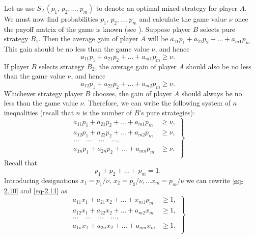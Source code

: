  Let us use $S_{A} (p_{1}, \, p_{2}, \ldots{}, p_{m})$ to denote an optimal mixed strategy for player $A$. We must now find probabilities $p_{1}, \, p_{2}, \ldots{}, p_{m}$ and calculate the game value $\nu$ once the payoff matrix of the game is known (see ). Suppose player $B$ selects pure strategy $B_{1}$. Then the average gain of player $A$ will be $a_{11}p_{1} + a_{21}p_{2}+ \ldots{} + a_{m1}p_{m}$ This gain should be no less than the game value $\nu$, and hence
\begin{equation*}%
a_{11}p_{1} + a_{21}p_{2}+ \ldots + a_{m1}p_{m} \geqslant \nu.
\end{equation*}
If player $B$ selects strategy $B_{2}$, the average gain of player $A$ should also
be no less than the game value $\nu$, and hence
\begin{equation*}%
a_{12}p_{1} + a_{22}p_{2}+ \ldots + a_{m2}p_{m} \geqslant \nu.
\end{equation*}
Whichever strategy player $B$ chooses, the gain of player $A$ should
always be no less than the game value $\nu$. Therefore, we can write the
following system of $n$ inequalities (recall that $n$ is the number of $B$'s pure
strategies):
\begin{equation}%
\left.
\begin{split}
a_{11}p_{1} + a_{21}p_{2}+ \ldots + a_{m1}p_{m} & \geqslant \nu, \\
a_{12}p_{1} + a_{22}p_{2}+ \ldots + a_{m2}p_{m} & \geqslant \nu, \\
\ldots \quad \ldots \quad \ldots  \quad \ldots, \\
a_{1n}p_{1} + a_{2n}p_{2}+ \ldots + a_{mn}p_{m} & \geqslant \nu. \\
\end{split}
\right\}
\label{eq-2.10}
\end{equation}
Recall that
\begin{equation}
p_{1} + p_{2}+ \ldots + p_{m} = 1.
\label{eq-2.11}
\end{equation}
Introducing designations $x_{1} = 	p_{1}/\nu, \, x_{2} = p_{2}/\nu, \ldots x_{m} = 	p_{m}/\nu$ we can rewrite \eqref{eq-2.10} and \eqref{eq-2.11} as
\begin{equation}%
\left.
\begin{split}
a_{11}x_{1} + a_{21}x_{2}+ \ldots + x_{m1}p_{m} & \geqslant 1, \\
a_{12}x_{1} + a_{22}x_{2}+ \ldots + a_{m2}x_{m} & \geqslant 1, \\
\ldots \quad \ldots \quad \ldots  \quad \ldots, \\
a_{1n}x_{1} + a_{2n}x_{2}+ \ldots + a_{mn}x_{m} & \geqslant 1. \\
\label{eq-2.12}
\end{split}
\right\}
\end{equation}

